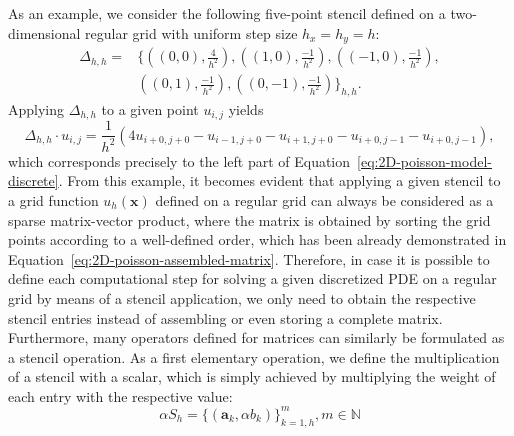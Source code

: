 As an example, we consider the following five-point stencil defined on a two-dimensional regular grid with uniform step size $h_x = h_y = h$:
\begin{equation}
	\begin{split}
		\Delta_{h,h} = & \bigg\{ \left( \left( 0,0 \right), \frac{4}{h^2}\right), \left(\left(1,0\right), \frac{-1}{h^2}\right), \left(\left(-1,0\right), \frac{-1}{h^2}\right), \\ & \left(\left(0,1\right), \frac{-1}{h^2}\right), \left(\left(0,-1\right), \frac{-1}{h^2}\right) \bigg\}_{h,h}.
	\end{split}
	\label{eq:five-point-stencil}
\end{equation}
Applying $\Delta_{h,h}$ to a given point $u_{i,j}$ yields 
\begin{equation}
	\Delta_{h,h} \cdot u_{i,j} = \frac{1}{h^2} \left(4 u_{i+0,j+0}  - u_{i-1,j+0} - u_{i+1,j+0} - u_{i+0,j-1} - u_{i+0,j-1}\right),
\end{equation}
which corresponds precisely to the left part of Equation~\eqref{eq:2D-poisson-model-discrete}.
From this example, it becomes evident that applying a given stencil to a grid function $u_h(\bm{x})$ defined on a regular grid can always be considered as a sparse matrix-vector product, where the matrix is obtained by sorting the grid points according to a well-defined order, which has been already demonstrated in Equation~\eqref{eq:2D-poisson-assembled-matrix}.
Therefore, in case it is possible to define each computational step for solving a given discretized PDE on a regular grid by means of a stencil application, we only need to obtain the respective stencil entries instead of assembling or even storing a complete matrix.
Furthermore, many operators defined for matrices can similarly be formulated as a stencil operation.
As a first elementary operation, we define the multiplication of a stencil with a scalar, which is simply achieved by multiplying the weight of each entry with the respective value:
\begin{equation}
	\alpha S_h = \{(\bm{a}_k, \alpha b_k) \}_{k=1, h}^m, m \in \mathbb{N}
\end{equation}

